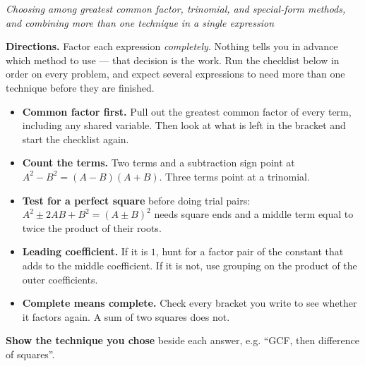 \documentclass[12pt]{article}
\begin{document}

\begin{center}
\textit{Choosing among greatest common factor, trinomial, and special-form
methods, and combining more than one technique in a single expression}
\end{center}

\noindent\textbf{Directions.} Factor each expression \emph{completely}. Nothing
tells you in advance which method to use --- that decision is the work. Run the
checklist below in order on every problem, and expect several expressions to
need more than one technique before they are finished.

\begin{itemize}[leftmargin=1.2cm, itemsep=2pt, topsep=3pt]
\item \textbf{Common factor first.} Pull out the greatest common factor of every
term, including any shared variable. Then look at what is left in the bracket
and start the checklist again.
\item \textbf{Count the terms.} Two terms and a subtraction sign point at
$A^2 - B^2 = (A - B)(A + B)$. Three terms point at a trinomial.
\item \textbf{Test for a perfect square} before doing trial pairs:
$A^2 \pm 2AB + B^2 = (A \pm B)^2$ needs square ends and a middle term equal to
twice the product of their roots.
\item \textbf{Leading coefficient.} If it is $1$, hunt for a factor pair of the
constant that adds to the middle coefficient. If it is not, use grouping on the
product of the outer coefficients.
\item \textbf{Complete means complete.} Check every bracket you write to see
whether it factors again. A sum of two squares does not.
\end{itemize}

\vspace{0.15cm}
\noindent\textbf{Show the technique you chose} beside each answer, e.g.
``GCF, then difference of squares''.




\end{document}
